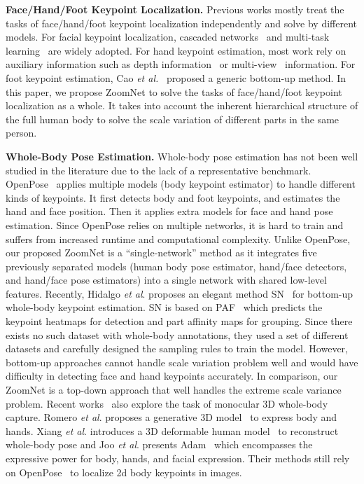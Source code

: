 \documentclass[runningheads]{llncs}
\newcommand{\etal}{\textit{et al}. }
\begin{document}
	\textbf{Face/Hand/Foot Keypoint Localization.} 
	Previous works mostly treat the tasks of face/hand/foot keypoint localization independently and solve by different models. For facial keypoint localization, cascaded networks~\cite{cao2014face,sun2013deep,tzimiropoulos2015project,xiong2013supervised} and multi-task learning~\cite{trigeorgis2016mnemonic,zhang2015learning} are widely adopted. For hand keypoint estimation, most work rely on auxiliary information such as depth information~\cite{oikonomidis2012tracking,sharp2015accurate,sridhar2015fast} or multi-view~\cite{guan2006multi,neverova2014multi} information. For foot keypoint estimation, Cao \emph{et al.}~\cite{cao2018openpose} proposed a generic bottom-up method. In this paper, we propose ZoomNet to solve the tasks of face/hand/foot keypoint localization as a whole. It takes into account the inherent hierarchical structure of the full human body to solve the scale variation of different parts in the same person.
	
	\textbf{Whole-Body Pose Estimation.} Whole-body pose estimation has not been well studied in the literature due to the lack of a representative benchmark. OpenPose~\cite{cao2018openpose,cao2017realtime,simon2017hand} applies multiple models (body keypoint estimator) to handle different kinds of keypoints. It first detects body and foot keypoints, and estimates the hand and face position. Then it applies extra models for face and hand pose estimation. Since OpenPose relies on multiple networks, it is hard to train and suffers from increased runtime and computational complexity. Unlike OpenPose, our proposed ZoomNet is a “single-network” method as it integrates five previously separated models (human body pose estimator, hand/face detectors, and hand/face pose estimators) into a single network with shared low-level features. Recently, Hidalgo \etal proposes an elegant method SN~\cite{hidalgo2019single} for bottom-up whole-body keypoint estimation. SN is based on PAF~\cite{cao2017realtime} which predicts the keypoint heatmaps for detection and part affinity maps for grouping. Since there exists no such dataset with whole-body annotations, they used a set of different datasets and carefully designed the sampling rules to train the model. However, bottom-up approaches cannot handle scale variation problem well and would have difficulty in detecting face and hand keypoints accurately. In comparison, our ZoomNet is a top-down approach that well handles the extreme scale variance problem. Recent works~\cite{joo2018total,romero2017embodied,xiang2019monocular} also explore the task of monocular 3D whole-body capture. Romero \etal proposes a generative 3D model~\cite{romero2017embodied} to express body and hands. Xiang \etal introduces a 3D deformable human model~\cite{xiang2019monocular} to reconstruct whole-body pose and Joo \etal presents Adam~\cite{joo2018total} which encompasses the expressive power for body, hands, and facial expression. Their methods still rely on OpenPose~\cite{cao2018openpose} to localize 2d body keypoints in images. 
	
\end{document}
